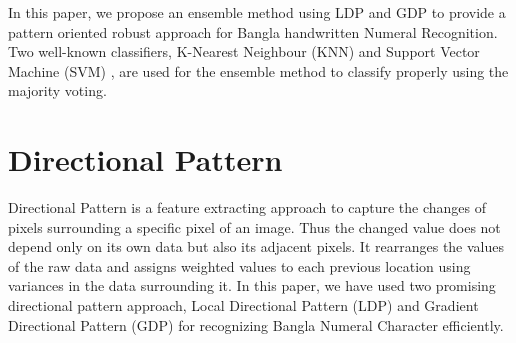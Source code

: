 \documentclass[conference]{IEEEtran}
\begin{document}
In this paper, we propose an ensemble method using LDP and GDP to provide a pattern oriented robust approach for Bangla handwritten Numeral Recognition. Two well-known classifiers, K-Nearest Neighbour (KNN) \cite{1967KNN} and Support Vector Machine (SVM) \cite{1995SVM}, are used for the ensemble method to classify properly using the majority voting. 

\section{Directional Pattern}
Directional Pattern is a feature extracting approach \cite{2002LBP,2010LDP,2012GDP,2017POMF} to capture the changes of pixels surrounding a specific pixel of an image. Thus the changed value does not depend only on its own data but also its adjacent pixels. It rearranges the values of the raw data and assigns weighted values to each previous location using variances in the data surrounding it. In this paper, we have used two promising directional pattern approach, Local Directional Pattern (LDP) \cite{2010LDP} and Gradient Directional Pattern (GDP) \cite{2012GDP} for recognizing Bangla Numeral Character efficiently.
\end{document}
